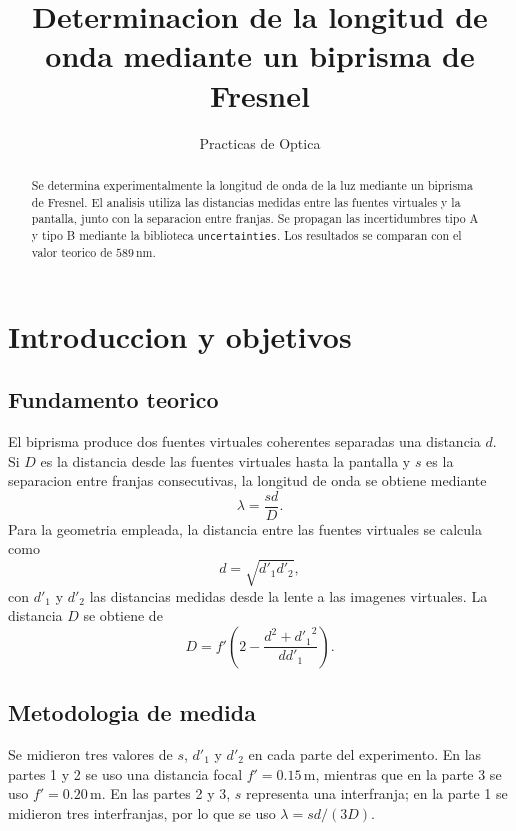 \documentclass[a4paper,11pt]{article}
\begin{document}
\title{Determinacion de la longitud de onda mediante un biprisma de Fresnel}
\author{Practicas de Optica}
\maketitle

\begin{abstract}
Se determina experimentalmente la longitud de onda de la luz mediante un biprisma
de Fresnel. El analisis utiliza las distancias medidas entre las fuentes virtuales
y la pantalla, junto con la separacion entre franjas. Se propagan las incertidumbres
tipo A y tipo B mediante la biblioteca \texttt{uncertainties}. Los resultados se
comparan con el valor teorico de $589\,\mathrm{nm}$.
\end{abstract}

\section{Introduccion y objetivos}

\subsection{Fundamento teorico}
El biprisma produce dos fuentes virtuales coherentes separadas una distancia $d$.
Si $D$ es la distancia desde las fuentes virtuales hasta la pantalla y $s$ es la
separacion entre franjas consecutivas, la longitud de onda se obtiene mediante
\begin{equation}
\lambda = \frac{s d}{D}.
\end{equation}
Para la geometria empleada, la distancia entre las fuentes virtuales se calcula
como
\begin{equation}
d = \sqrt{d'_1 d'_2},
\end{equation}
con $d'_1$ y $d'_2$ las distancias medidas desde la lente a las imagenes virtuales.
La distancia $D$ se obtiene de
\begin{equation}
D = f'\left(2 - \frac{d^2 + {d'_1}^2}{d d'_1}\right).
\end{equation}

\subsection{Metodologia de medida}
Se midieron tres valores de $s$, $d'_1$ y $d'_2$ en cada parte del experimento.
En las partes 1 y 2 se uso una distancia focal $f'=0.15\,\mathrm{m}$, mientras
que en la parte 3 se uso $f'=0.20\,\mathrm{m}$. En las partes 2 y 3, $s$ representa
una interfranja; en la parte 1 se midieron tres interfranjas, por lo que se uso
$\lambda=s d/(3D)$.
\end{document}
